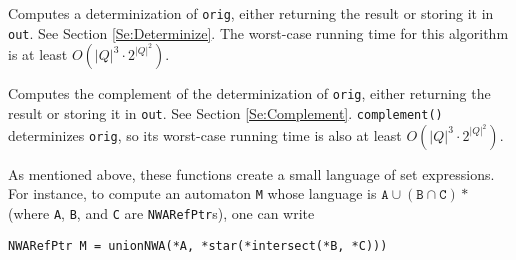 \begin{functionlist}
    Computes a determinization of \texttt{orig}, either returning the
    result or storing it in \texttt{out}.
    See Section \ref{Se:Determinize}. The worst-case running time for this
    algorithm is at least $O({|Q|^3} \cdot2^{|Q|^2})$.

    Computes the complement of the determinization of \texttt{orig},
    either returning the result or storing it in \texttt{out}.
    See Section
    \ref{Se:Complement}. %
    \texttt{complement()} determinizes \texttt{orig}, so its worst-case
    running time is also at least $O({|Q|^3} \cdot2^{|Q|^2})$.


\end{functionlist}

As mentioned above, these functions create a small language of set
expressions. For instance, to compute an automaton \texttt{M} whose language
is $\texttt{A} \cup (\texttt{B} \cap \texttt{C})*$ (where \texttt{A},
\texttt{B}, and \texttt{C} are \texttt{NWARefPtr}s), one can write
\begin{center}
  \texttt{NWARefPtr M = unionNWA(*A, *star(*intersect(*B, *C)))}
\end{center}


